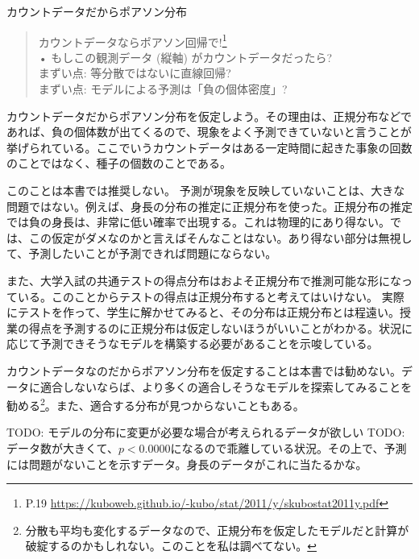 \begin{SMbox}{カウントデータだからポアソン分布}
    \begin{quote}
        カウントデータならポアソン回帰で!\footnote{P.19 \url{https://kuboweb.github.io/-kubo/stat/2011/y/skubostat2011y.pdf}}\\
        • もしこの観測データ (縦軸) がカウントデータだったら?\\
        まずい点: 等分散ではないに直線回帰?\\
        まずい点: モデルによる予測は「負の個体密度」?\\
    \end{quote}
    カウントデータだからポアソン分布を仮定しよう。その理由は、正規分布などであれば、負の個体数が出てくるので、現象をよく予測できていないと言うことが挙げられている。ここでいうカウントデータはある一定時間に起きた事象の回数のことではなく、種子の個数のことである。

    このことは本書では推奨しない。
    予測が現象を反映していないことは、大きな問題ではない。例えば、身長の分布の推定に正規分布を使った。正規分布の推定では負の身長は、非常に低い確率で出現する。これは物理的にあり得ない。では、この仮定がダメなのかと言えばそんなことはない。あり得ない部分は無視して、予測したいことが予測できれば問題にならない。

    また、大学入試の共通テストの得点分布はおよそ正規分布で推測可能な形になっている。このことからテストの得点は正規分布すると考えてはいけない。
    実際にテストを作って、学生に解かせてみると、その分布は正規分布とは程遠い。授業の得点を予測するのに正規分布は仮定しないほうがいいことがわかる。状況に応じて予測できそうなモデルを構築する必要があることを示唆している。

    カウントデータなのだからポアソン分布を仮定することは本書では勧めない。データに適合しないならば、より多くの適合しそうなモデルを探索してみることを勧める\footnote{分散も平均も変化するデータなので、正規分布を仮定したモデルだと計算が破綻するのかもしれない。このことを私は調べてない。}。また、適合する分布が見つからないこともある。
\end{SMbox}




TODO: モデルの分布に変更が必要な場合が考えられるデータが欲しい
TODO: データ数が大きくて、$p<0.0000$になるので乖離している状況。その上で、予測には問題がないことを示すデータ。身長のデータがこれに当たるかな。
\fi

